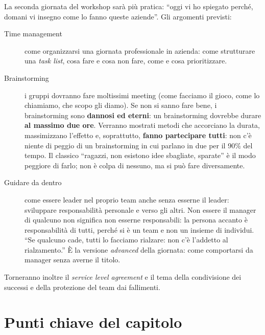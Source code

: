 La seconda giornata del workshop sarà più pratica: ``oggi vi ho spiegato
perché, domani vi insegno come lo fanno queste aziende''. Gli argomenti
previsti:
\begin{description}
  \item[Time management] come organizzarsi una giornata professionale in
        azienda: come strutturare una \emph{task list}, cosa fare e cosa non
        fare, come e cosa prioritizzare.
  \item[Brainstorming] i gruppi dovranno fare moltissimi meeting (come facciamo
        il gioco, come lo chiamiamo, che scopo gli diamo). Se non si sanno fare
        bene, i brainstorming sono \textbf{dannosi ed eterni}: un brainstorming
        dovrebbe durare \textbf{al massimo due ore}. Verranno mostrati metodi
        che accorciano la durata, massimizzano l'effetto e, soprattutto,
        \textbf{fanno partecipare tutti}: non c'è niente di peggio di un
        brainstorming in cui parlano in due per il 90\% del tempo. Il classico
        ``ragazzi, non esistono idee sbagliate, sparate'' è il modo peggiore di
        farlo; non è colpa di nessuno, ma si può fare diversamente.
  \item[Guidare da dentro] come essere leader nel proprio team anche senza
        esserne il leader: sviluppare responsabilità personale e verso gli
        altri. Non essere il manager di qualcuno non significa non esserne
        responsabili: la persona accanto è responsabilità di tutti, perché si
        è un team e non un insieme di individui. ``Se qualcuno cade, tutti lo
        facciamo rialzare: non c'è l'addetto al rialzamento.'' È la versione
        \emph{advanced} della giornata: come comportarsi da manager senza
        averne il titolo.
\end{description}
Torneranno inoltre il \emph{service level agreement} e il tema della
condivisione dei successi e della protezione del team dai fallimenti.

\section*{Punti chiave del capitolo}

